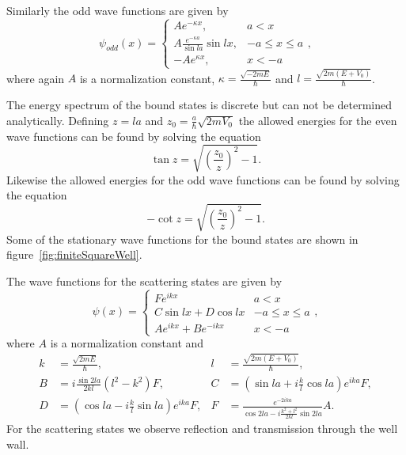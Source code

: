 \documentclass[12pt,a4paper]{article}
\begin{document}
Similarly the odd wave functions are given by
\begin{equation}
\psi_{odd} (x) = \begin{cases} A e^{- \kappa x}, & a < x \\
                                A \frac{e^{- \kappa a}}{\sin la} \sin l x, & -a \leq x \leq a \\
                                - A e^{\kappa x}, & x < -a \end{cases},
\end{equation}
where again $A$ is a normalization constant, $\kappa = \frac{\sqrt{-2 m E}}{\hbar}$ and $l = \frac{\sqrt{2 m (E + V_0)}}{\hbar}$.

The energy spectrum of the bound states is discrete but can not be determined analytically. Defining $z = l a$ and $z_0 = \frac{a}{\hbar} \sqrt{2 m V_0}$ the allowed energies for the even wave functions can be found by solving the equation
\begin{equation}
\tan z = \sqrt{\left(\frac{z_0}{z} \right)^2 - 1}. \label{eq:evenEnergy}
\end{equation}
Likewise the allowed energies for the odd wave functions can be found by solving the equation
\begin{equation}
- \cot z = \sqrt{\left(\frac{z_0}{z} \right)^2 - 1}. \label{eq:oddEnergy}
\end{equation}
Some of the stationary wave functions for the bound states are shown in figure~\ref{fig:finiteSquareWell}.

The wave functions for the scattering states are given by
\begin{equation}
\psi(x) = \begin{cases} F e^{ikx} & a < x \\
                        C \sin lx + D \cos lx & -a \leq x \leq a \\
                        A e^{ikx} + B e^{-ikx} & x < -a \end{cases},
\end{equation}
where $A$ is a normalization constant and
\begin{align*}
k &= \frac{\sqrt{2 m E}}{\hbar},& l &= \frac{\sqrt{2 m (E + V_0)}}{\hbar}, \\
B &= i \frac{\sin 2 la}{2 kl} \left( l^2 - k^2 \right) F,& C &= \left( \sin la + i \frac{k}{l} \cos la \right) e^{ika} F, \\
D &= \left( \cos la - i \frac{k}{l} \sin la \right) e^{ika} F,& F &= \frac{e^{-2ika}}{\cos 2la - i \frac{k^2 + l^2}{2kl} \sin 2la} A.
\end{align*}
For the scattering states we observe reflection and transmission through the well wall.
\end{document}
